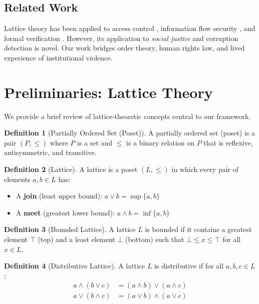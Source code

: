 \documentclass[11pt,a4paper]{article}
\theoremstyle{definition}
\newtheorem{definition}{Definition}
\begin{document}
\subsection{Related Work}

Lattice theory has been applied to access control \cite{denning_lattice_1976}, information flow security \cite{sandhu_lattice_1993}, and formal verification \cite{cousot_abstract_1977}. However, its application to \emph{social justice} and corruption detection is novel. Our work bridges order theory, human rights law, and lived experience of institutional violence.

\section{Preliminaries: Lattice Theory}

We provide a brief review of lattice-theoretic concepts central to our framework.

\begin{definition}[Partially Ordered Set (Poset)]
A partially ordered set (poset) is a pair $(P, \leq)$ where $P$ is a set and $\leq$ is a binary relation on $P$ that is reflexive, antisymmetric, and transitive.
\end{definition}

\begin{definition}[Lattice]
A lattice is a poset $(L, \leq)$ in which every pair of elements $a, b \in L$ has:
\begin{itemize}
    \item A \textbf{join} (least upper bound): $a \vee b = \sup\{a, b\}$
    \item A \textbf{meet} (greatest lower bound): $a \wedge b = \inf\{a, b\}$
\end{itemize}
\end{definition}

\begin{definition}[Bounded Lattice]
A lattice $L$ is bounded if it contains a greatest element $\top$ (top) and a least element $\bot$ (bottom) such that $\bot \leq x \leq \top$ for all $x \in L$.
\end{definition}

\begin{definition}[Distributive Lattice]
A lattice $L$ is distributive if for all $a, b, c \in L$:
\begin{align}
a \wedge (b \vee c) &= (a \wedge b) \vee (a \wedge c) \label{eq:dist1} \\
a \vee (b \wedge c) &= (a \vee b) \wedge (a \vee c) \label{eq:dist2}
\end{align}
\end{definition}
\end{document}
